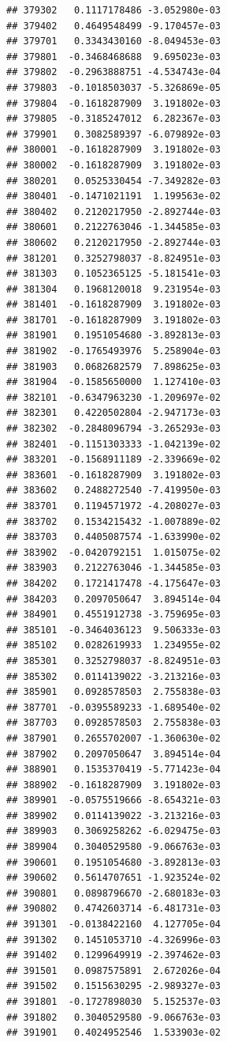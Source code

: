 \documentclass[ignorenonframetext,]{beamer}
\begin{document}
\begin{frame}[fragile]
\begin{verbatim}
## 379302   0.1117178486 -3.052980e-03
## 379402   0.4649548499 -9.170457e-03
## 379701   0.3343430160 -8.049453e-03
## 379801  -0.3468468688  9.695023e-03
## 379802  -0.2963888751 -4.534743e-04
## 379803  -0.1018503037 -5.326869e-05
## 379804  -0.1618287909  3.191802e-03
## 379805  -0.3185247012  6.282367e-03
## 379901   0.3082589397 -6.079892e-03
## 380001  -0.1618287909  3.191802e-03
## 380002  -0.1618287909  3.191802e-03
## 380201   0.0525330454 -7.349282e-03
## 380401  -0.1471021191  1.199563e-02
## 380402   0.2120217950 -2.892744e-03
## 380601   0.2122763046 -1.344585e-03
## 380602   0.2120217950 -2.892744e-03
## 381201   0.3252798037 -8.824951e-03
## 381303   0.1052365125 -5.181541e-03
## 381304   0.1968120018  9.231954e-03
## 381401  -0.1618287909  3.191802e-03
## 381701  -0.1618287909  3.191802e-03
## 381901   0.1951054680 -3.892813e-03
## 381902  -0.1765493976  5.258904e-03
## 381903   0.0682682579  7.898625e-03
## 381904  -0.1585650000  1.127410e-03
## 382101  -0.6347963230 -1.209697e-02
## 382301   0.4220502804 -2.947173e-03
## 382302  -0.2848096794 -3.265293e-03
## 382401  -0.1151303333 -1.042139e-02
## 383201  -0.1568911189 -2.339669e-02
## 383601  -0.1618287909  3.191802e-03
## 383602   0.2488272540 -7.419950e-03
## 383701   0.1194571972 -4.208027e-03
## 383702   0.1534215432 -1.007889e-02
## 383703   0.4405087574 -1.633990e-02
## 383902  -0.0420792151  1.015075e-02
## 383903   0.2122763046 -1.344585e-03
## 384202   0.1721417478 -4.175647e-03
## 384203   0.2097050647  3.894514e-04
## 384901   0.4551912738 -3.759695e-03
## 385101  -0.3464036123  9.506333e-03
## 385102   0.0282619933  1.234955e-02
## 385301   0.3252798037 -8.824951e-03
## 385302   0.0114139022 -3.213216e-03
## 385901   0.0928578503  2.755838e-03
## 387701  -0.0395589233 -1.689540e-02
## 387703   0.0928578503  2.755838e-03
## 387901   0.2655702007 -1.360630e-02
## 387902   0.2097050647  3.894514e-04
## 388901   0.1535370419 -5.771423e-04
## 388902  -0.1618287909  3.191802e-03
## 389901  -0.0575519666 -8.654321e-03
## 389902   0.0114139022 -3.213216e-03
## 389903   0.3069258262 -6.029475e-03
## 389904   0.3040529580 -9.066763e-03
## 390601   0.1951054680 -3.892813e-03
## 390602   0.5614707651 -1.923524e-02
## 390801   0.0898796670 -2.680183e-03
## 390802   0.4742603714 -6.481731e-03
## 391301  -0.0138422160  4.127705e-04
## 391302   0.1451053710 -4.326996e-03
## 391402   0.1299649919 -2.397462e-03
## 391501   0.0987575891  2.672026e-04
## 391502   0.1515630295 -2.989327e-03
## 391801  -0.1727898030  5.152537e-03
## 391802   0.3040529580 -9.066763e-03
## 391901   0.4024952546  1.533903e-02

\end{verbatim}
\end{frame}
\end{document}
